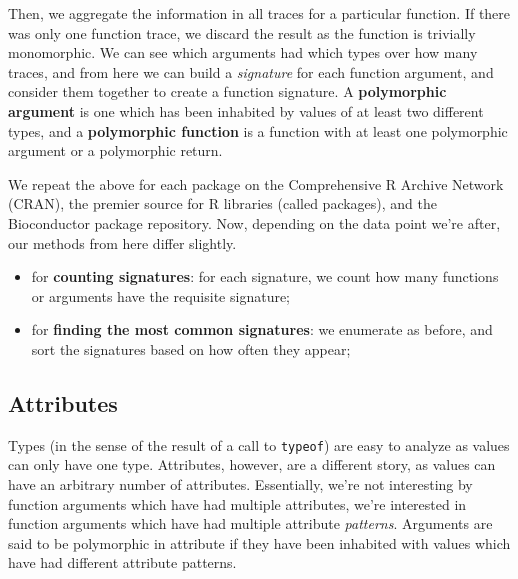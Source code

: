 \documentclass[acmsmall,10pt,review,anonymous]{acmart}\settopmatter{printfolios=true,printccs=false,printacmref=false}
\begin{document}
Then, we aggregate the information in all traces for a particular function.
If there was only one function trace, we discard the result as the function
is trivially monomorphic.  We can see which arguments had which types over
how many traces, and from here we can build a \textit{signature} for each
function argument, and consider them together to create a function
signature.  A \textbf{polymorphic argument} is one which has been inhabited
by values of at least two different types, and a \textbf{polymorphic
  function} is a function with at least one polymorphic argument or a
polymorphic return.

We repeat the above for each package on the Comprehensive R Archive Network
(CRAN), the premier source for R libraries (called packages), and the
Bioconductor package repository.  Now, depending on the data point we're
after, our methods from here differ slightly.

\begin{itemize}
    \item for \textbf{counting signatures}: for each signature, we count how
      many functions or arguments have the requisite signature;
    \item for \textbf{finding the most common signatures}: we enumerate as
      before, and sort the signatures based on how often they appear;
\end{itemize}

%
%
\subsection{Attributes}\label{sec:method:attributes}

Types (in the sense of the result of a call to {\tt typeof}) are easy to
analyze as values can only have one type.  Attributes, however, are a
different story, as values can have an arbitrary number of attributes.
Essentially, we're not interesting by function arguments which have had
multiple attributes, we're interested in function arguments which have had
multiple attribute \textit{patterns}. 
Arguments are said to be polymorphic in attribute if they have been
inhabited with values which have had different attribute patterns.  

\end{document}
